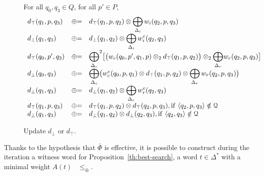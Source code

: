 \begin{figure}[ht]
For all $q_0, q_3 \in Q$, for all $p' \in P$,
\[
\begin{array}{lcl}
d_\top(q_1, p, q_3) & \opluseq &
  d_\top(q_1, p, q_2) \otimes
  \displaystyle\bigoplus_{\Deltai} \weii(q_2, p, q_3)\\
%
d_\bot(q_1, q_3) & \opluseq &
  d_\bot(q_1, q_2) \otimes
  \displaystyle\bigoplus_{\Deltai} \weiei(q_2, q_3)\\
%
d_\top(q_0, p', q_3) & \opluseq &
  {\displaystyle\bigoplus_{\Deltac}}^2
  \bigl[ \bigl( \weic(q_0, p', q_1, p) \otimes_2
  d_\top(q_1, p, q_2) \bigr) \otimes_2
  {\displaystyle\bigoplus_{\Deltar}} \weir(q_2, p, q_3) \bigr]\\
%
d_\bot(q_0, q_3) & \opluseq &
  {\displaystyle\bigoplus_{\Deltac}}
  \bigl(
  \weiec(q_0, p, q_1) \otimes
   d_\top(q_1, p, q_2) \otimes
  \displaystyle\bigoplus_{\Deltar} \weir(q_2, p, q_3)\bigr)\\
%
d_\bot(q_1, q_3) & \opluseq &
  d_\bot(q_1, q_2) \otimes
  \displaystyle\bigoplus_{\Deltar} \weier(q_2, q_3)\\
%
d_\top(q_1, p, q_3) & \opluseq &
  d_\top(q_1, p, q_2) \otimes d_\top(q_2, p, q_3),
  \mathrm{if~} \< q_2, p, q_3> \notin \Q \\
%
d_\bot(q_1, q_3) & \opluseq &
  d_\bot(q_1, q_2) \otimes d_\bot(q_2, q_3), \mathrm{if~} \< q_2, q_3> \notin \Q \\
\end{array}
\]
%
\caption{Update $d_\bot$ or $d_\top$.}
\label{fig:best-update}
\end{figure}
%
Thanks to the hypothesis that $\bar\Phi$ is effective, 
it is possible to construct during the iteration a witness word
for Proposition~\ref{th:best-search}, 
\ie a word $t \in \Delta^*$ with a minimal weight $A(t)$ \wrt~$\leq_\oplus$.

